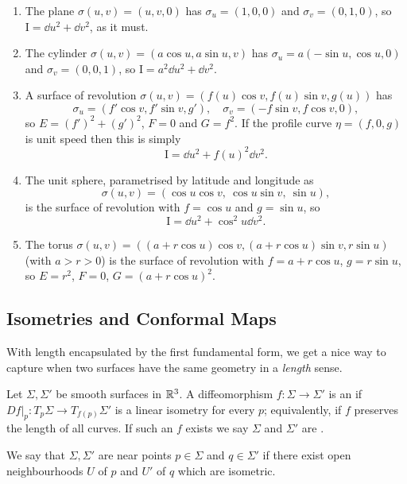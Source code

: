 \documentclass[a4paper]{scrartcl}
\begin{document}
\begin{example}
    \begin{enumerate}[label=(\roman*)]
        \item The plane $\sigma(u,v) = (u,v,0)$ has $\sigma_u = (1,0,0)$ and $\sigma_v = (0,1,0)$, so $\mathrm{I} = \dd u^2 + \dd v^2$, as it must.
        \item The cylinder $\sigma(u,v) = (a\cos u, a \sin u, v)$ has $\sigma_u = a(-\sin u, \cos u, 0)$ and $\sigma_v = (0,0,1)$, so $\mathrm{I} = a^2 \dd u^2 + \dd v^2$.
        \item A surface of revolution $\sigma(u,v) = (f(u)\cos v, f(u)\sin v, g(u))$ has
        $$
        \sigma_u = (f'\cos v, f'\sin v, g'), \quad \sigma_v = (-f\sin v, f\cos v, 0),
        $$
        so $E = (f')^2 + (g')^2$, $F = 0$ and $G = f^2$. If the profile curve $\eta = (f, 0, g)$ is unit speed then this is simply
        $$
        \mathrm{I} = \dd u^2 + f(u)^2 \dd v^2.
        $$
        \item The unit sphere, parametrised by latitude and longitude as
        $$
        \sigma(u,v) = (\cos u\cos v,\ \cos u \sin v,\ \sin u),
        $$
        is the surface of revolution with $f = \cos u$ and $g = \sin u$, so
        $$
        \mathrm{I} = \dd u^2 + \cos^2 u \dd v^2.
        $$
        \item The torus $\sigma(u,v) = ((a + r\cos u)\cos v, (a+r\cos u)\sin v, r \sin u)$ (with $a > r > 0$) is the surface of revolution with $f = a + r\cos u$, $g = r \sin u$, so $E = r^2$, $F = 0$, $G = (a + r \cos u)^2$.
    \end{enumerate}
\end{example}

\subsection{Isometries and Conformal Maps}

With length encapsulated by the first fundamental form, we get a nice way to capture when two surfaces have the same geometry in a \emph{length} sense.

\begin{definition}[Isometric]
    Let $\Sigma, \Sigma'$ be smooth surfaces in $\mathbb{R}^3$. A diffeomorphism $f: \Sigma \rightarrow \Sigma'$ is an  if $\left.Df\right|_p : T_p\Sigma \rightarrow T_{f(p)}\Sigma'$ is a linear isometry for every $p$; equivalently, if $f$ preserves the length of all curves. If such an $f$ exists we say $\Sigma$ and $\Sigma'$ are .
\end{definition}
\begin{definition}
    We say that $\Sigma, \Sigma'$ are  near points $p \in \Sigma$ and $q \in \Sigma'$ if there exist open neighbourhoods $U$ of $p$ and $U'$ of $q$ which are isometric.
\end{definition}
\end{document}
